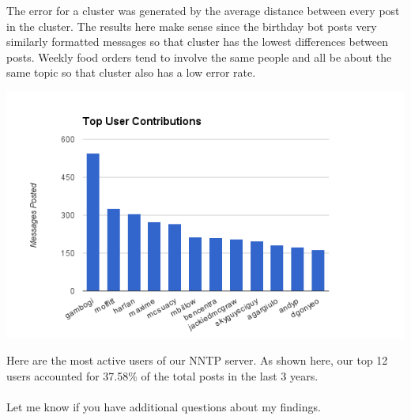 \documentclass[9pt]{extarticle} %
\begin{document}
The error for a cluster was generated by the average distance between every post in the cluster. The results here make sense since the birthday bot posts very similarly formatted messages so that cluster has the lowest differences between posts. Weekly food orders tend to involve the same people and all be about the same topic so that cluster also has a low error rate. 

\centerline{\includegraphics[width=0.8\linewidth]{imgs/2016-02-15-users.png}}

Here are the most active users of our NNTP server. As shown here, our top 12 users accounted for 37.58\% of the total posts in the last 3 years. \\
\\
Let me know if you have additional questions about my findings. 
\end{document}
